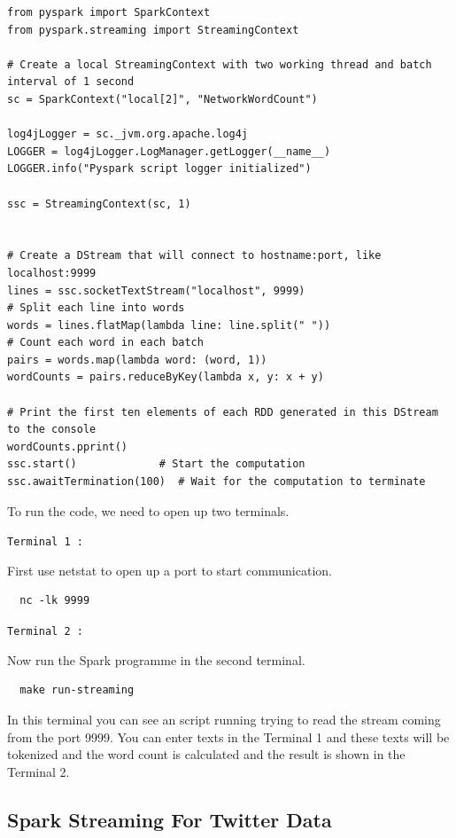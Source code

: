 \begin{lstlisting}
from pyspark import SparkContext
from pyspark.streaming import StreamingContext

# Create a local StreamingContext with two working thread and batch interval of 1 second
sc = SparkContext("local[2]", "NetworkWordCount")

log4jLogger = sc._jvm.org.apache.log4j
LOGGER = log4jLogger.LogManager.getLogger(__name__)
LOGGER.info("Pyspark script logger initialized")

ssc = StreamingContext(sc, 1)


# Create a DStream that will connect to hostname:port, like localhost:9999
lines = ssc.socketTextStream("localhost", 9999)
# Split each line into words
words = lines.flatMap(lambda line: line.split(" "))
# Count each word in each batch
pairs = words.map(lambda word: (word, 1))
wordCounts = pairs.reduceByKey(lambda x, y: x + y)

# Print the first ten elements of each RDD generated in this DStream to the console
wordCounts.pprint()
ssc.start()             # Start the computation
ssc.awaitTermination(100)  # Wait for the computation to terminate

\end{lstlisting}

To run the code, we need to open up two terminals.

\verb|Terminal 1 :|

First use netstat to open up a port to start communication.

\begin{lstlisting}
  nc -lk 9999
\end{lstlisting}


\verb|Terminal 2 :|

Now run the Spark programme in the second terminal.

\begin{lstlisting}
  make run-streaming
\end{lstlisting}

In this terminal you can see an script running trying to read
the stream coming from the port 9999. You can enter texts in the
Terminal 1 and these texts will be tokenized and the word count is
calculated and the result is shown in the Terminal 2.

\subsection{Spark Streaming For Twitter Data}

